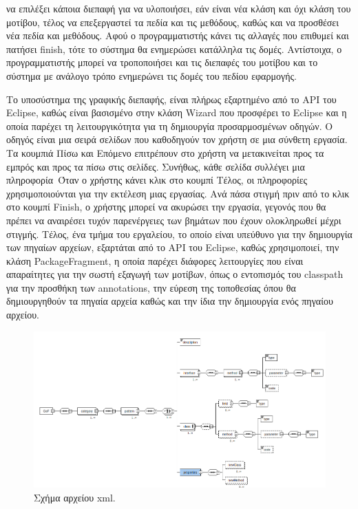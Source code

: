 να επιλέξει κάποια διεπαφή για να υλοποιήσει, εάν είναι νέα κλάση και όχι κλάση του μοτίβου, 
τέλος να επεξεργαστεί τα πεδία και τις μεθόδους, καθώς και να προσθέσει νέα πεδία και μεθόδους. Αφού ο προγραμματιστής κάνει τις 
αλλαγές που επιθυμεί και πατήσει finish, τότε το σύστημα θα ενημερώσει κατάλληλα τις δομές. 
Αντίστοιχα, ο προγραμματιστής μπορεί να τροποποιήσει και τις διεπαφές του μοτίβου και το σύστημα με ανάλογο τρόπο ενημερώνει 
τις δομές του πεδίου εφαρμογής. \par
Το υποσύστημα της γραφικής διεπαφής, είναι πλήρως εξαρτημένο από το API του Eclipse, καθώς είναι 
βασισμένο στην κλάση Wizard που προσφέρει το Eclipse και η οποία παρέχει τη λειτουργικότητα για τη δημιουργία 
προσαρμοσμένων οδηγών. Ο οδηγός είναι μια σειρά σελίδων που καθοδηγούν τον χρήστη σε μια σύνθετη εργασία. 
Τα κουμπιά Πίσω και Επόμενο επιτρέπουν στο χρήστη να μετακινείται προς τα εμπρός και προς τα πίσω στις σελίδες. 
Συνήθως, κάθε σελίδα συλλέγει μια πληροφορία\anotelia \  Όταν ο χρήστης κάνει κλικ στο κουμπί Τέλος, οι πληροφορίες χρησιμοποιούνται 
για την εκτέλεση μιας εργασίας. Ανά πάσα στιγμή πριν από το κλικ στο κουμπί Finish, ο χρήστης μπορεί να ακυρώσει την εργασία, 
γεγονός που θα πρέπει να αναιρέσει τυχόν παρενέργειες των βημάτων που έχουν ολοκληρωθεί μέχρι στιγμής. Τέλος, ένα τμήμα 
του εργαλείου, το οποίο είναι υπεύθυνο για την δημιουργία των πηγαίων αρχείων, εξαρτάται από το API του Eclipse, καθώς χρησιμοποιεί, 
την κλάση PackageFragment, η οποία παρέχει διάφορες λειτουργίες που είναι απαραίτητες για την σωστή εξαγωγή των μοτίβων, 
όπως ο εντοπισμός του classpath για την προσθήκη των annotations, την εύρεση της τοποθεσίας όπου θα δημιουργηθούν τα πηγαία αρχεία 
καθώς και την ίδια την δημιουργία ενός πηγαίου αρχείου.
\begin{figure}[H]
    \centering
    \includegraphics[width=1.0\textwidth]{Figures/xsd_diagram.png}
    \caption{Σχήμα αρχείου xml.}
    \label{fig:xsd}
\end{figure}
